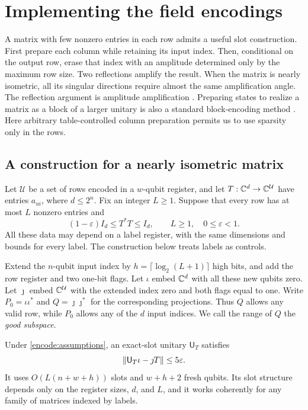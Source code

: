 \section{Implementing the field encodings}\label{sec:encoders}

A matrix with few nonzero entries in each row admits a useful slot
construction. First prepare each column while retaining its input index.
Then, conditional on the output row, erase that index with an amplitude
determined only by the maximum row size. Two reflections amplify the
result. When the matrix is nearly isometric, all its singular directions
require almost the same amplification angle.
The reflection argument is amplitude amplification
\cite[Section~2]{BHMT2002}. Preparing states to realize a matrix as a block
of a larger unitary is also a standard block-encoding method
\cite[Lemmas~47--48]{GSLW2019}. Here arbitrary table-controlled column
preparation permits us to use sparsity only in the rows.

\subsection{A construction for a nearly isometric matrix}

Let $\mathcal U$ be a set of rows encoded in a $w$-qubit register, and
let $T:\mathbb C^d\to\mathbb C^{\mathcal U}$ have entries $a_{ui}$, where $d\le2^n$.
Fix an integer $L\ge1$. Suppose that every row has at most $L$ nonzero
entries and
\begin{equation}\label{encode:assumptions}
 (1-\varepsilon)I_d\le T^*T\le I_d,
 \qquad L\ge1,\quad 0\le\varepsilon<1.
\end{equation}
All these data may depend on a label register, with the same dimensions
and bounds for every label. The construction below treats labels as controls.

Extend the $n$-qubit input index by
$h=\lceil\log_2(L+1)\rceil$ high bits, and add the row register and two
one-bit flags. Let $\iota$ embed $\mathbb C^d$ with all these new qubits zero.
Let $\jmath$ embed $\mathbb C^{\mathcal U}$ with the extended index zero and
both flags equal to one. Write $P_0=\iota\iota^*$ and
$Q=\jmath\jmath^*$ for the corresponding projections. Thus $Q$ allows
any valid row, while $P_0$ allows any of the $d$ input indices.
We call the range of $Q$ the \emph{good subspace}.

\begin{lemma}\label{encode:row-sparse}
Under \eqref{encode:assumptions}, an exact-slot unitary $\mathsf U_T$
satisfies
\begin{equation}\label{encode:generic-error}
 \lVert \mathsf U_T\iota-\jmath T\rVert\le5\varepsilon.
\end{equation}
It uses $O(L(n+w+h))$ slots and $w+h+2$ fresh qubits. Its slot structure
depends only on the register sizes, $d$, and $L$, and it works coherently
for any family of matrices indexed by labels.
\end{lemma}

